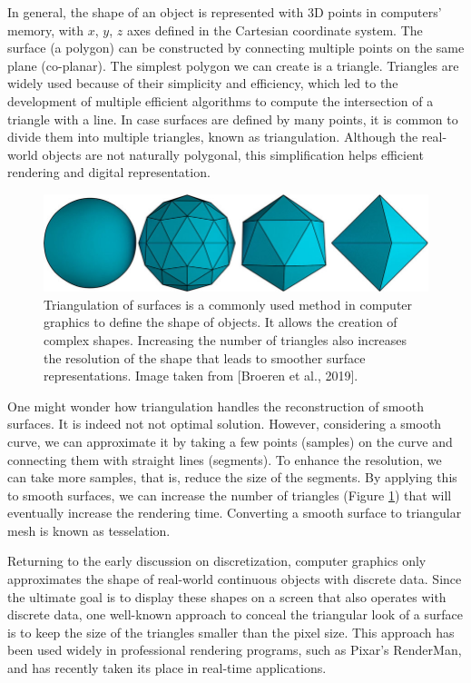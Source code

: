 In general, the shape of an object is represented with 3D points in computers' memory, with $x$, $y$, $z$ axes defined in the Cartesian coordinate system. The surface (a polygon) can be constructed by connecting multiple points on the same plane (co-planar). The simplest polygon we can create is a triangle. Triangles are widely used because of their simplicity and efficiency, which led to the development of multiple efficient algorithms to compute the intersection of a triangle with a line. In case surfaces are defined by many points, it is common to divide them into multiple triangles, known as triangulation. Although the real-world objects are not naturally polygonal, this simplification helps efficient rendering and digital representation.

\begin{figure}
  \centering
   \includegraphics[width=0.7\linewidth]{Images/Triangulation-of-surfaces-Any-curved-surface-in-this-case-a-sphere-can-be-approximated.png}
   \caption{Triangulation of surfaces is a commonly used method in computer graphics to define the shape of objects. It allows the creation of complex shapes. Increasing the number of triangles also increases the resolution of the shape that leads to smoother surface representations. Image taken from [Broeren et al., 2019].}
   \label{fig:triangulation}
\end{figure}

One might wonder how triangulation handles the reconstruction of smooth surfaces. It is indeed not not optimal solution. However, considering a smooth curve, we can approximate it by taking a few points (samples) on the curve and connecting them with straight lines (segments). To enhance the resolution, we can take more samples, that is, reduce the size of the segments. By applying this to smooth surfaces, we can increase the number of triangles (Figure \ref{fig:triangulation}) that will eventually increase the rendering time. Converting a smooth surface to triangular mesh is known as tesselation.

Returning to the early discussion on discretization, computer graphics only approximates the shape of real-world continuous objects with discrete data. Since the ultimate goal is to display these shapes on a screen that also operates with discrete data, one well-known approach to conceal the triangular look of a surface is to keep the size of the triangles smaller than the pixel size. This approach has been used widely in professional rendering programs, such as Pixar's RenderMan, and has recently taken its place in real-time applications.

